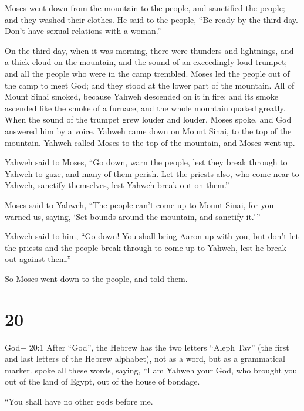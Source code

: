  Moses went down from the mountain to the people, and
sanctified the people; and they washed their clothes.  He
said to the people, ``Be ready by the third day. Don't have sexual
relations with a woman.''

 On the third day, when it was morning, there were thunders
and lightnings, and a thick cloud on the mountain, and the sound of an
exceedingly loud trumpet; and all the people who were in the camp
trembled.  Moses led the people out of the camp to meet
God; and they stood at the lower part of the mountain.  All
of Mount Sinai smoked, because Yahweh descended on it in fire; and its
smoke ascended like the smoke of a furnace, and the whole mountain
quaked greatly.  When the sound of the trumpet grew louder
and louder, Moses spoke, and God answered him by a voice. 
Yahweh came down on Mount Sinai, to the top of the mountain. Yahweh
called Moses to the top of the mountain, and Moses went up.

 Yahweh said to Moses, ``Go down, warn the people, lest
they break through to Yahweh to gaze, and many of them perish.
 Let the priests also, who come near to Yahweh, sanctify
themselves, lest Yahweh break out on them.''

 Moses said to Yahweh, ``The people can't come up to Mount
Sinai, for you warned us, saying, `Set bounds around the mountain, and
sanctify it.'\,''

 Yahweh said to him, ``Go down! You shall bring Aaron up
with you, but don't let the priests and the people break through to come
up to Yahweh, lest he break out against them.''

 So Moses went down to the people, and told them.

\hypertarget{section-19}{%
\section{20}\label{section-19}}

 God+ 20:1 After ``God'', the Hebrew has the two letters
``Aleph Tav'' (the first and last letters of the Hebrew alphabet), not
as a word, but as a grammatical marker. spoke all these words, saying,
 ``I am Yahweh your God, who brought you out of the land of
Egypt, out of the house of bondage.

 ``You shall have no other gods before me.

